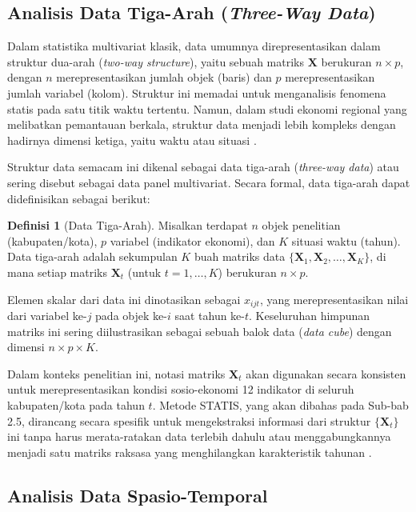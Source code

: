 \documentclass[a4paper]{article}
\theoremstyle{definition} %
\newtheorem{definition}{Definisi}[section]
\begin{document}
\subsection{Analisis Data Tiga-Arah (\textit{Three-Way Data})}

Dalam statistika multivariat klasik, data umumnya direpresentasikan dalam struktur dua-arah (\textit{two-way structure}), yaitu sebuah matriks $\mathbf{X}$ berukuran $n \times p$, dengan $n$ merepresentasikan jumlah objek (baris) dan $p$ merepresentasikan jumlah variabel (kolom). Struktur ini memadai untuk menganalisis fenomena statis pada satu titik waktu tertentu. Namun, dalam studi ekonomi regional yang melibatkan pemantauan berkala, struktur data menjadi lebih kompleks dengan hadirnya dimensi ketiga, yaitu waktu atau situasi \citet{kroonenberg2008}.

Struktur data semacam ini dikenal sebagai data tiga-arah (\textit{three-way data}) atau sering disebut sebagai data panel multivariat. Secara formal, data tiga-arah dapat didefinisikan sebagai berikut:

\begin{definition}[Data Tiga-Arah]
	Misalkan terdapat $n$ objek penelitian (kabupaten/kota), $p$ variabel (indikator ekonomi), dan $K$ situasi waktu (tahun). Data tiga-arah adalah sekumpulan $K$ buah matriks data $\{\mathbf{X}_1, \mathbf{X}_2, \dots, \mathbf{X}_K\}$, di mana setiap matriks $\mathbf{X}_t$ (untuk $t=1, \dots, K$) berukuran $n \times p$.
	
	Elemen skalar dari data ini dinotasikan sebagai $x_{ijt}$, yang merepresentasikan nilai dari variabel ke-$j$ pada objek ke-$i$ saat tahun ke-$t$. Keseluruhan himpunan matriks ini sering diilustrasikan sebagai sebuah balok data (\textit{data cube}) dengan dimensi $n \times p \times K$.
\end{definition}

Dalam konteks penelitian ini, notasi matriks $\mathbf{X}_t$ akan digunakan secara konsisten untuk merepresentasikan kondisi sosio-ekonomi 12 indikator di seluruh kabupaten/kota pada tahun $t$. Metode STATIS, yang akan dibahas pada Sub-bab 2.5, dirancang secara spesifik untuk mengekstraksi informasi dari struktur $\{\mathbf{X}_t\}$ ini tanpa harus merata-ratakan data terlebih dahulu atau menggabungkannya menjadi satu matriks raksasa yang menghilangkan karakteristik tahunan \citet{lavit94}.

\subsection{Analisis Data Spasio-Temporal}
\end{document}
